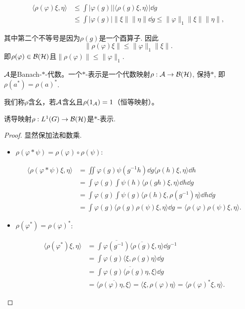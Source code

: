 \begin{align*}\langle \rho(\varphi)\xi,\eta\rangle 
&\leqslant \int |\varphi(g)||\langle \rho(g)\xi,\eta\rangle| \dd g\\ 
&\leqslant \int |\varphi(g)|\|\xi\|\|\eta\| \dd g 
\leqslant \|\varphi\|_1\|\xi\|\|\eta\|,\end{align*}

其中第二个不等号是因为$\rho(g)$是一个酉算子. 因此
\[\|\rho(\varphi)\xi\| \leqslant \|\varphi\|_1\|\xi\|.\]
即$\rho(\varphi) \in \mathcal{B}(\mathcal{H})$且$\|\rho(\varphi)\| \leqslant \|\varphi\|_1$.

\begin{definition}
    $\mathcal{A}$是Banach-$*$-代数。一个$*$-表示是一个代数映射$\rho:\mathcal{A} \to \mathcal{B}(\mathcal{H})$, 保持$*$, 即$\rho(a^*) = \rho(a)^*$.

    我们称$\rho$含幺，若$\mathcal{A}$含幺且$\rho(1_{\mathcal{A}}) = 1$（恒等映射）。
\end{definition}
\begin{proposition}
    诱导映射$\rho:L^1(G) \to \mathcal{B}(\mathcal{H})$是$*$-表示.
\end{proposition}
\begin{proof}
    显然保加法和数乘.
    \begin{itemize}
        \item $\rho(\varphi * \psi) = \rho(\varphi) \circ \rho(\psi)$:

\begin{align*}
    \langle \rho(\varphi * \psi)\xi,\eta\rangle 
    &= \iint \varphi(g)\psi(g^{-1}h) \dd g \langle \rho(h)\xi,\eta\rangle \dd h \\ 
    &= \int \varphi(g)\int \psi(h)\langle \rho(gh)\xi,\eta\rangle \dd h \dd g \\ 
    &= \int \varphi(g)\int \psi(g)\langle \rho(h)\xi,\rho(g^{-1})\eta\rangle \dd h \dd g \\ 
    &= \int \varphi(g) \langle \rho(g)\rho(\psi)\xi,\eta\rangle \dd g = \langle \rho(\varphi)\rho(\psi)\xi,\eta\rangle.
\end{align*}
\item $\rho(\varphi^*) = \rho(\varphi)^*$:

\begin{align*}
\langle \rho(\varphi^*)\xi,\eta\rangle 
&= \int \overline{\varphi(g^{-1})} \langle \overline{\rho(g)}\xi,\eta\rangle \dd g^{-1} \\
&= \int \varphi(g)\langle \xi,\rho(g) \eta \rangle \dd g \\ 
&= \overline{\int \varphi(g)\langle \rho(g)\eta,\xi \rangle \dd g} \\
&= \overline{\langle \rho(\varphi)\eta,\xi \rangle} 
= \langle \xi,\rho(\varphi)\eta \rangle = \langle \rho(\varphi)^* \xi,\eta\rangle.
\end{align*}\qedhere
    \end{itemize}
\end{proof}


